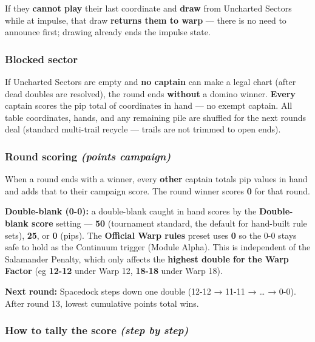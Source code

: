 \documentclass[11pt]{article}
\begin{document}
If they \textbf{cannot play} their last coordinate and \textbf{draw}
from Uncharted Sectors while at impulse, that draw \textbf{returns them
to warp} --- there is no need to announce first; drawing already ends
the impulse state.

\subsubsection{Blocked sector}\label{blocked-sector}

If Uncharted Sectors are empty and \textbf{no captain} can make a legal
chart (after dead doubles are resolved), the round ends \textbf{without}
a domino winner. \textbf{Every} captain scores the pip total of coordinates in
hand --- no exempt captain. All table coordinates, hands, and any remaining
pile are shuffled for the next round\textquotesingle s deal (standard
multi-trail recycle --- trails are not trimmed to open ends).

\subsubsection{\texorpdfstring{Round scoring \emph{(points
campaign)}}{Round scoring (points campaign)}}\label{round-scoring-points-campaign}

When a round ends with a winner, every \textbf{other} captain totals pip
values in hand and adds that to their campaign score. The round winner
scores \textbf{0} for that round.

\textbf{Double-blank (0-0):} a double-blank caught in hand scores by the
\textbf{Double-blank score} setting --- \textbf{50} (tournament
standard, the default for hand-built rule sets), \textbf{25}, or
\textbf{0} (pips). The \textbf{Official Warp rules} preset uses
\textbf{0} so the 0-0 stays safe to hold as the Continuum trigger
(Module Alpha). This is independent of the Salamander Penalty, which
only affects the \textbf{highest double for the Warp Factor} (eg
\textbf{12-12} under Warp 12, \textbf{18-18} under Warp 18).

\textbf{Next round:} Spacedock steps down one double (12-12 → 11-11 →
\ldots{} → 0-0). After round 13, lowest cumulative points total wins.

\subsubsection{\texorpdfstring{How to tally the score \emph{(step by
step)}}{How to tally the score (step by step)}}\label{how-to-tally-the-score-step-by-step}
\end{document}
